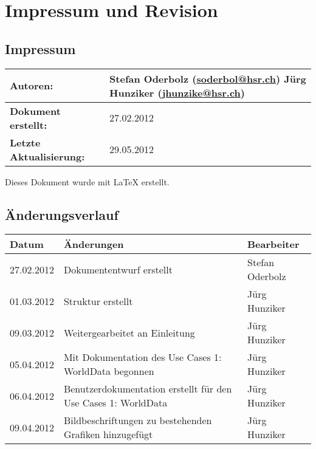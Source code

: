 \chapter*{Impressum und Revision}

\section*{Impressum}
\begin{longtable}{|l|p{10cm}|}
\hline 
\textbf{Autoren:} & Stefan Oderbolz (\url{soderbol@hsr.ch}) \newline
Jürg Hunziker (\url{jhunzike@hsr.ch}) \\ 
\hline 
\textbf{Dokument erstellt:} & 27.02.2012 \\ 
\hline 
\textbf{Letzte Aktualisierung:} & 29.05.2012 \\ 
\hline 
\end{longtable}

Dieses Dokument wurde mit \LaTeX{} erstellt.

\section*{Änderungsverlauf}

\begin{longtable}{|p{2cm}|p{9.5cm}|p{3cm}|}
\hline 
\textbf{Datum} & \textbf{Änderungen} & \textbf{Bearbeiter} \\ 
\hline 
27.02.2012 & Dokumententwurf erstellt & Stefan Oderbolz \\ 
\hline 
01.03.2012 & Struktur erstellt & Jürg Hunziker \\ 
\hline 
09.03.2012 & Weitergearbeitet an Einleitung & Jürg Hunziker \\ 
\hline 
05.04.2012 & Mit Dokumentation des Use Cases 1: WorldData begonnen & Jürg Hunziker \\ 
\hline 
06.04.2012 & Benutzerdokumentation erstellt für den Use Cases 1: WorldData & Jürg Hunziker \\ 
\hline 
09.04.2012 & Bildbeschriftungen zu bestehenden Grafiken hinzugefügt & Jürg Hunziker \\ 
\hline 
\end{longtable} 